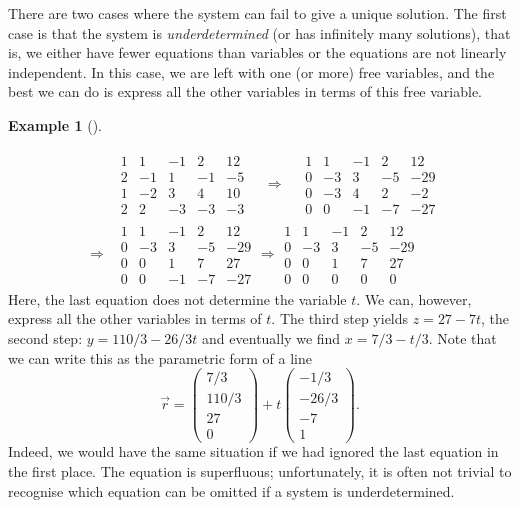 \documentclass[
  a4paper,
  DIV=11,
  numbers=noendperiod,
  oneside]{scrreprt}
\theoremstyle{definition}
\newtheorem{example}{Example}[chapter]
\theoremstyle{remark}
\begin{document}
There are two cases where the system can fail to give a unique solution.
The first case is that the system is \emph{underdetermined} (or has
infinitely many solutions), that is, we either have fewer equations than
variables or the equations are not linearly independent. In this case,
we are left with one (or more) free variables, and the best we can do is
express all the other variables in terms of this free variable.

\begin{example}[]\protect\hypertarget{exm-ge2}{}\label{exm-ge2}

\[\begin{aligned}
& &\begin{array}{rrrr|r}
 1 &   1& -1 & 2& 12  \\
 2 &  -1 & 1& -1 &-5 \\
1  &   -2& 3 & 4  & 10 \\
2 & 2 & -3 & -3 & -3    
\end{array}  \quad \Rightarrow \quad 
 \begin{array}{rrrr|r}
 1 &   1& -1 & 2& 12  \\
0&   -3 & 3& -5 &-29 \\
 0&  -3& 4 & 2  & -2 \\
  0&  0 &-1 & -7 & -27    
\end{array} \\
&\Rightarrow& \begin{array}{rrrr|r}
 1 &   1& -1 & 2& 12  \\
0&   -3 & 3& -5 &-29 \\
0& 0 & 1 & 7  & 27 \\
0& 0 & -1 & -7 & -27    
\end{array} \Rightarrow \begin{array}{rrrr|r}
1 &   1& -1 & 2& 12  \\
0&   -3 & 3& -5 &-29 \\
0& 0 & 1 & 7  & 27 \\
0 & 0 & 0 &  0 & 0    
\end{array} 
\end{aligned}\] Here, the last equation does not determine the variable
\(t\). We can, however, express all the other variables in terms of
\(t\). The third step yields \(z=27-7 t\), the second step:
\(y=110/3-26/3t\) and eventually we find \(x= 7/3-t/3\). Note that we
can write this as the parametric form of a line
\[\vec{r} =  \begin{pmatrix}   7/3 \\ 110/3 \\ 27 \\ 0  \end{pmatrix}  + t  \begin{pmatrix}   -1/3 \\ -26/3 \\ -7 \\ 1  \end{pmatrix}. \]
Indeed, we would have the same situation if we had ignored the last
equation in the first place. The equation is superfluous; unfortunately,
it is often not trivial to recognise which equation can be omitted if a
system is underdetermined.

\end{example}
\end{document}
